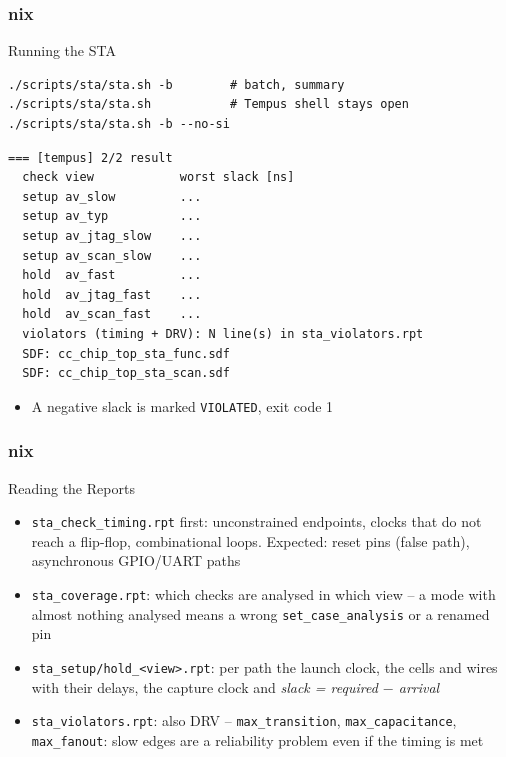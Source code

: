 \documentclass{beamer}
\newcommand{\astitle}{nix}
\newcommand{\assubtitle}{nix}
\newcommand{\cmd}[1]{\texttt{#1}}
\begin{document}
\renewcommand{\assubtitle}{Running the STA}
\begin{frame}[fragile]
\frametitle{\astitle}
\begin{block}{\assubtitle}
\begin{lstlisting}[style=sh]
./scripts/sta/sta.sh -b        # batch, summary
./scripts/sta/sta.sh           # Tempus shell stays open
./scripts/sta/sta.sh -b --no-si
\end{lstlisting}
\begin{lstlisting}[style=out]
=== [tempus] 2/2 result
  check view            worst slack [ns]
  setup av_slow         ...
  setup av_typ          ...
  setup av_jtag_slow    ...
  setup av_scan_slow    ...
  hold  av_fast         ...
  hold  av_jtag_fast    ...
  hold  av_scan_fast    ...
  violators (timing + DRV): N line(s) in sta_violators.rpt
  SDF: cc_chip_top_sta_func.sdf
  SDF: cc_chip_top_sta_scan.sdf
\end{lstlisting}
  \scriptsize
  \begin{itemize}
    \item A negative slack is marked \cmd{VIOLATED}, exit code 1
  \end{itemize}
\end{block}
\end{frame}

\renewcommand{\assubtitle}{Reading the Reports}
\begin{frame}
\frametitle{\astitle}
\begin{block}{\assubtitle}
  \begin{itemize}
    \item \cmd{sta\_check\_timing.rpt} first: unconstrained endpoints,
      clocks that do not reach a flip-flop, combinational loops.
      Expected: reset pins (false path), asynchronous GPIO/UART paths
    \item \cmd{sta\_coverage.rpt}: which checks are analysed in which
      view -- a mode with almost nothing analysed means a wrong
      \cmd{set\_case\_analysis} or a renamed pin
    \item \cmd{sta\_setup/hold\_<view>.rpt}: per path the launch clock,
      the cells and wires with their delays, the capture clock and
      \emph{slack = required $-$ arrival}
    \item \cmd{sta\_violators.rpt}: also DRV --
      \cmd{max\_transition}, \cmd{max\_capacitance}, \cmd{max\_fanout}:
      slow edges are a reliability problem even if the timing is met
  \end{itemize}
\end{block}
\end{frame}
\end{document}
